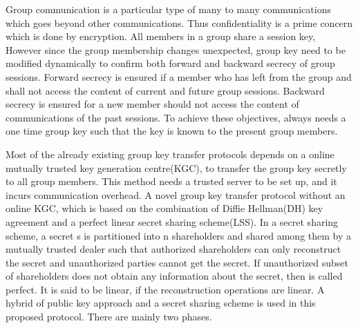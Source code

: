 \documentclass[10pt,a4paper,journal]{IEEEtran}
\begin{document}
\hspace{2em}Group communication is a particular type of many to many communications which goes beyond other communications. Thus confidentiality is a prime concern which is done by encryption. All members in a group share a session key, However since the group membership changes unexpected, group key need to be modified dynamically to confirm both forward and backward secrecy of group sessions. Forward secrecy is ensured if a member who has left from the group and shall not access the content of current and future group sessions. Backward secrecy is ensured for a new member should not access the content of communications of the past sessions. To achieve these objectives, always needs a one time group key such that the key is known to the present group members.

\hspace{2em} Most of the already existing group key transfer protocols depends on a online mutually trusted key generation centre(KGC), to transfer the group key secretly to all group members. This method needs a trusted server to be set up, and it incurs communication overhead. A novel group key transfer protocol\cite{2} without an online KGC, which is based on the combination of Diffie Hellman(DH) key agreement and a perfect linear secret sharing scheme(LSS)\cite{14}. In a secret sharing scheme, a secret s is partitioned into n shareholders and  shared among them by a mutually trusted dealer such that authorized shareholders can only reconstruct the secret and unauthorized parties cannot get the secret. If unauthorized subset of shareholders does not obtain any information about the secret, then  is called perfect. It is said to be linear, if the reconstruction operations are linear. A hybrid of public key approach and a secret sharing scheme is used in this proposed protocol. There are mainly two phases.
\end{document}
